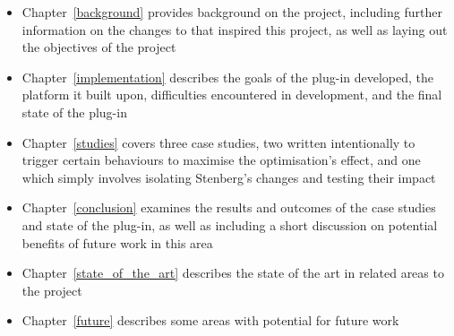 \begin{itemize}
	\item{Chapter~\ref{background} provides background on the project, including further information on the changes to  that inspired this project, as well as laying out the objectives of the project}
	\item{Chapter~\ref{implementation} describes the goals of the plug-in developed, the platform it built upon, difficulties encountered in development, and the final state of the plug-in}
	\item{Chapter~\ref{studies} covers three case studies, two written intentionally to trigger certain behaviours to maximise the optimisation's effect, and one which simply involves isolating Stenberg's changes and testing their impact}
	\item{Chapter~\ref{conclusion} examines the results and outcomes of the case studies and state of the plug-in, as well as including a short discussion on potential benefits of future work in this area}
	\item{Chapter~\ref{state_of_the_art} describes the state of the art in related areas to the project}
	\item{Chapter~\ref{future} describes some areas with potential for future work}
\end{itemize}
